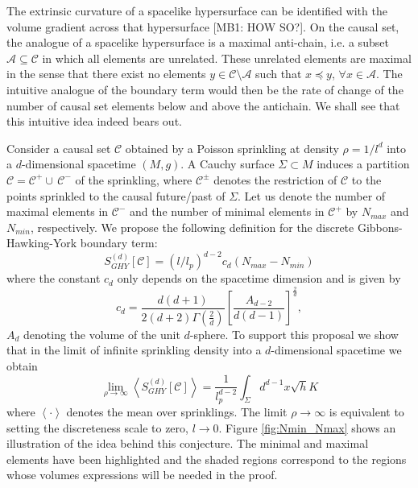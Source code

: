 \documentclass[12pt]{article}
\newcommand{\be}{\begin{equation}}
\newcommand{\ee}{\end{equation}}
\begin{document}
The extrinsic curvature of a spacelike hypersurface can be identified with the volume gradient across that hypersurface [MB1: HOW SO?]. On the causal set, the analogue of a spacelike hypersurface is a maximal anti-chain, i.e. a subset $\mathcal{A}\subseteq\mathcal{C}$ in which all elements are unrelated. These unrelated elements are maximal in the sense that there exist no elements $y\in\mathcal{C}\setminus\mathcal{A}$ such that $x\preceq y$, $\forall x\in\mathcal{A}$. The intuitive analogue of the boundary term would then be the rate of change of the number of causal set elements below and above the antichain. We shall see that this intuitive idea indeed bears out.

Consider a causal set $\mathcal C$ obtained by a Poisson sprinkling at density $\rho=1/l^d$ into a $d$-dimensional spacetime $(M,g)$. A Cauchy surface $\Sigma\subset M$ induces a partition $\mathcal C = \mathcal C^+ \cup\, \mathcal C^-$ of the sprinkling, where $\mathcal C^\pm$ denotes the restriction of $\mathcal C$ to the points sprinkled to the causal future/past of $\Sigma$. Let us denote the number of maximal elements in $\mathcal C^-$ and the number of minimal elements in $\mathcal C^+$ by $N_{max}$ and $N_{min}$, respectively. We propose the following definition for the discrete Gibbons-Hawking-York boundary term:
\be\label{GH_boundary_to_causet}
S^{(d)}_{GHY}[\mathcal C]=\left(l/l_p\right)^{d-2}c_{d}(N_{max}-N_{min})
\ee
where the constant $c_{d}$ only depends on the spacetime dimension and is given by
\be\label{Cn}
c_{d}=\frac{d(d+1)}{2(d+2)\Gamma\left(\frac{2}{d}\right)}\left[\frac{A_{d-2}}{d(d-1)}\right]^{\frac{2}{d}},
\ee
$A_d$ denoting the volume of the unit $d$-sphere. To support this proposal we show that in the limit of infinite sprinkling density into a $d$-dimensional spacetime we obtain
\be
\lim_{\rho\rightarrow\infty}\left\langle S^{(d)}_{GHY}[\mathcal C] \right\rangle= \frac{1}{l_p^{d-2}}\int_{\Sigma} d^{d-1}x \sqrt{h} K\label{eq:mainconjecture}
\ee
where $\left\langle\cdot\right\rangle$ denotes the mean over sprinklings. The limit $\rho\rightarrow\infty$ is equivalent to setting the discreteness scale to zero, $l\rightarrow 0$. Figure \ref{fig:Nmin_Nmax} shows an illustration of the idea behind this conjecture. The minimal and maximal elements have been highlighted and the shaded regions correspond to the regions whose volumes expressions will be needed in the proof.
\end{document}
